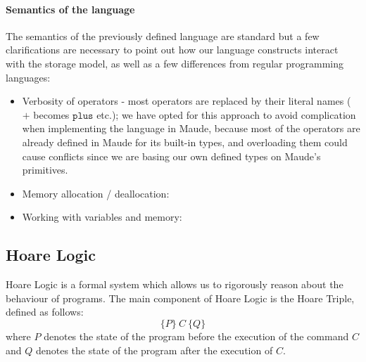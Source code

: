 \documentclass[12pt,a4paper]{article}
\begin{document}
\paragraph{Semantics of the language}
{
The semantics of the previously defined language are standard but a few clarifications are necessary to point out how our language constructs interact with the storage model, as well as a few differences from regular programming languages:
\begin{itemize}
	\item{Verbosity of operators - most operators are replaced by their literal names ( \(+\) becomes \(\mathtt{plus}\) etc.); we have opted for this approach to avoid complication when implementing the language in Maude, because most of the operators are already defined in Maude for its built-in types, and overloading them could cause conflicts since we are basing our own defined types on Maude's primitives.}
	\item{Memory allocation / deallocation: }
	\item{Working with variables and memory: }
\end{itemize}
}
\subsection{Hoare Logic}
Hoare Logic is a formal system which allows us to rigorously reason about the behaviour of programs.
The main component of Hoare Logic is the Hoare Triple, defined as follows:
\[ \{P\}\  C\  \{Q\} \]
where \(P\) denotes the state of the program before the execution of the command \(C\) and \(Q\) denotes the state of the program after the execution of \(C\). \\
\end{document}
